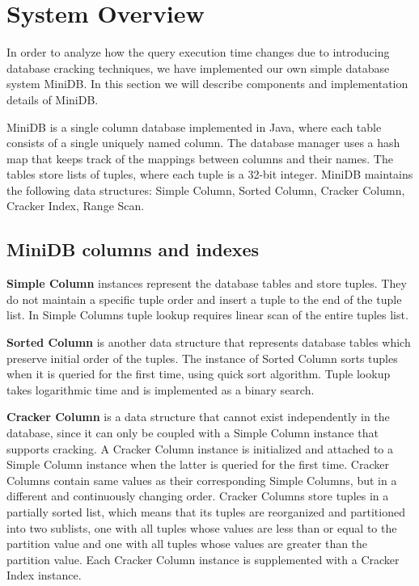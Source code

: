 \section{System Overview}
In order to analyze how the query execution time changes due to introducing database cracking techniques, we have implemented our own simple database system MiniDB. In this section we will describe components and implementation details of MiniDB.

MiniDB is a single column database implemented in Java, where each table consists of a single uniquely named column. The database manager uses a hash map that keeps track of the mappings between columns and their names.  The tables store lists of tuples, where each tuple is a 32-bit integer. MiniDB maintains the following data structures: Simple Column, Sorted Column, Cracker Column, Cracker Index, Range Scan. 
\label{sec:system}

\subsection{MiniDB columns and indexes}
\textbf{Simple Column} instances represent the database tables and store tuples. They do not maintain a specific tuple order and insert a tuple to the end of the tuple list. In Simple Columns tuple lookup requires linear scan of the entire tuples list. 

\textbf{Sorted Column} is another data structure that represents database tables which preserve initial order of the tuples. The instance of Sorted Column sorts tuples when it is queried for the first time, using quick sort algorithm. Tuple lookup takes logarithmic time and is implemented as a binary search. 

\textbf{Cracker Column} is a data structure that cannot exist independently in the database, since it can only be coupled with a Simple Column instance that supports cracking. A Cracker Column instance is initialized and attached to a Simple Column instance when the latter is queried for the first time. Cracker Columns contain same values as their corresponding Simple Columns, but in a different and continuously changing order. Cracker Columns store tuples in a partially sorted list, which means that its tuples are reorganized and partitioned into two sublists, one with all tuples whose values are less than or equal to the partition value and one with all tuples whose values are greater than the partition value. Each Cracker Column instance is supplemented with a  Cracker Index instance. 

